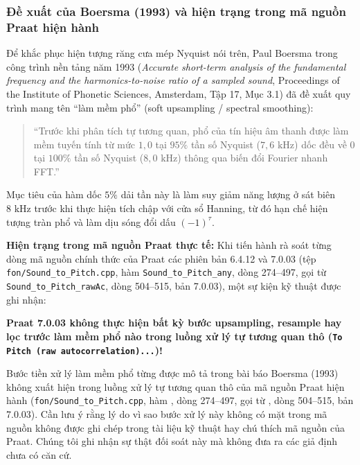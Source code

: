 \subsubsection*{Đề xuất của Boersma (1993) và hiện trạng trong mã nguồn Praat hiện hành}
Để khắc phục hiện tượng răng cưa mép Nyquist nói trên, Paul Boersma trong công trình nền tảng năm 1993 (\emph{Accurate short-term analysis of the fundamental frequency and the harmonics-to-noise ratio of a sampled sound}, Proceedings of the Institute of Phonetic Sciences, Amsterdam, Tập 17, Mục 3.1) đã đề xuất quy trình mang tên ``làm mềm phổ'' (soft upsampling / spectral smoothing):
\begin{quote}
``Trước khi phân tích tự tương quan, phổ của tín hiệu âm thanh được làm mềm tuyến tính từ mức $1{,}0$ tại $95\%$ tần số Nyquist ($7{,}6\text{ kHz}$) dốc đều về $0$ tại $100\%$ tần số Nyquist ($8{,}0\text{ kHz}$) thông qua biến đổi Fourier nhanh FFT.''
\end{quote}
Mục tiêu của hàm dốc $5\%$ dải tần này là làm suy giảm năng lượng ở sát biên $8\text{ kHz}$ trước khi thực hiện tích chập với cửa sổ Hanning, từ đó hạn chế hiện tượng tràn phổ và làm dịu sóng đổi dấu $(-1)^\tau$.

\textbf{Hiện trạng trong mã nguồn Praat thực tế:} Khi tiến hành rà soát từng dòng mã nguồn chính thức của Praat các phiên bản 6.4.12 và 7.0.03 (tệp \texttt{fon/Sound\_to\_Pitch.cpp}, hàm \texttt{Sound\_to\_Pitch\_any}, dòng 274--497, gọi từ \texttt{Sound\_to\_Pitch\_rawAc}, dòng 504--515, bản 7.0.03), một sự kiện kỹ thuật được ghi nhận:
\begin{center}
\textbf{Praat 7.0.03 không thực hiện bất kỳ bước upsampling, resample hay lọc trước làm mềm phổ nào trong luồng xử lý tự tương quan thô (\texttt{To Pitch (raw autocorrelation)...})!}
\end{center}
Bước tiền xử lý làm mềm phổ từng được mô tả trong bài báo Boersma (1993) không xuất hiện trong luồng xử lý tự tương quan thô của mã nguồn Praat hiện hành (\texttt{fon/Sound\_to\_Pitch.cpp}, hàm , dòng 274--497, gọi từ , dòng 504--515, bản 7.0.03). Cần lưu ý rằng lý do vì sao bước xử lý này không có mặt trong mã nguồn không được ghi chép trong tài liệu kỹ thuật hay chú thích mã nguồn của Praat. Chúng tôi ghi nhận sự thật đối soát này mà không đưa ra các giả định chưa có căn cứ.

